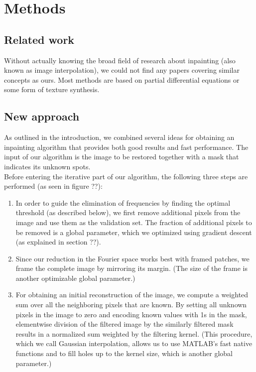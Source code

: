 \documentclass[10pt,conference,compsocconf]{IEEEtran}
\begin{document}
\section{Methods}
\subsection{Related work}
Without actually knowing the broad field of research about inpainting (also known as image interpolation), we could not find any papers covering similar concepts as ours. Most methods are based on partial differential equations or some form of texture synthesis.

\subsection{New approach}
As outlined in the introduction, we combined several ideas for obtaining an inpainting algorithm that provides both good results and fast performance. The input of our algorithm is the image to be restored together with a mask that indicates its unknown spots.\\
Before entering the iterative part of our algorithm, the following three steps are performed (as seen in figure ??):
\begin{enumerate}
\item In order to guide the elimination of frequencies by finding the optimal threshold (as described below), we first remove additional pixels from the image and use them as the validation set. The fraction of additional pixels to be removed is a global parameter, which we optimized using gradient descent (as explained in section ??).
\item Since our reduction in the Fourier space works best with framed patches, we frame the complete image by mirroring its margin. (The size of the frame is another optimizable global parameter.)
\item For obtaining an initial reconstruction of the image, we compute a weighted sum over all the neighboring pixels that are known. By setting all unknown pixels in the image to zero and encoding known values with 1s in the mask, elementwise division of the filtered image by the similarly filtered mask results in a normalized sum weighted by the filtering kernel. (This procedure, which we call Gaussian interpolation, allows us to use MATLAB's fast native functions and to fill holes up to the kernel size, which is another global parameter.)
\end{enumerate}
\end{document}
